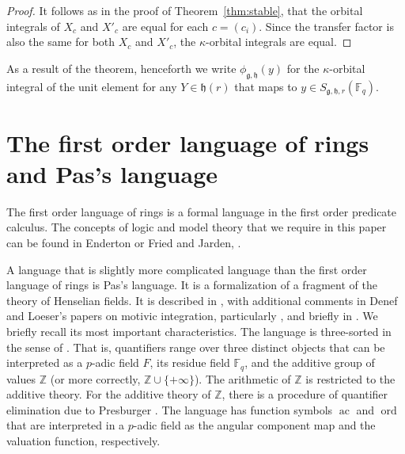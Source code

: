 \documentclass[11pt]{amsart}
\theoremstyle{definition}
\theoremstyle{remark}
\numberwithin{equation}{theorem}
\def\f{{\mathbb{F}_q}}
\newcommand{\ring}[1]{\mathbb{#1}}
\def\Fq{{\mathbb F}_q}
\def\op#1{\operatorname{#1}}
\def\lie#1{{\mathfrak{#1}}}
\def\orb#1#2{{\phi_{\lie{#1},\lie{#2}}}}
\begin{document}
\begin{proof}
It follows as in the proof of Theorem~\ref{thm:stable}, that the
orbital integrals of $X_c$ and $X'_c$ are equal for each
$c=(c_i)$.  Since the transfer factor is also the same for both
$X_c$ and $X'_c$, the $\kappa$-orbital integrals are equal.
\end{proof}

As a result of the theorem, henceforth we write $\orb{g}{h}(y)$
for the $\kappa$-orbital integral of the unit element for any
$Y\in\lie{h}(r)$ that maps to $y\in S_{\lie{g},\lie{h},r}(\f)$.


\section{The first order language of rings and Pas's language}
\label{sec:Pas}


The first order language of rings is a formal language in the
first order predicate calculus.  The concepts of logic and model
theory that we require in this paper can be found in Enderton
\cite{E} or Fried and Jarden, \cite{FJ}.

A language that is slightly more complicated language than the
first order language of rings is Pas's language. It is a
formalization of a fragment of the theory of Henselian fields. It
is described in \cite{Pas}, with additional comments in Denef and
Loeser's papers on motivic integration, particularly \cite{DLD},
and briefly in \cite{HC}. We briefly recall its most important
characteristics. The language is three-sorted in the sense of
\cite{E}. That is, quantifiers range over three distinct objects
that can be interpreted as a $p$-adic field $F$, its residue field
$\Fq$, and the additive group of values $\ring{Z}$ (or more
correctly, $\ring{Z}\cup\{+\infty\}$). The arithmetic of
$\ring{Z}$ is restricted to the additive theory. For the additive
theory of $\ring{Z}$, there is a procedure of quantifier
elimination due to Presburger \cite{Pres}. The language has
function symbols $\op{ac}$ and $\op{ord}$ that are interpreted in
a $p$-adic field as the angular component map and the valuation
function, respectively.
\end{document}
